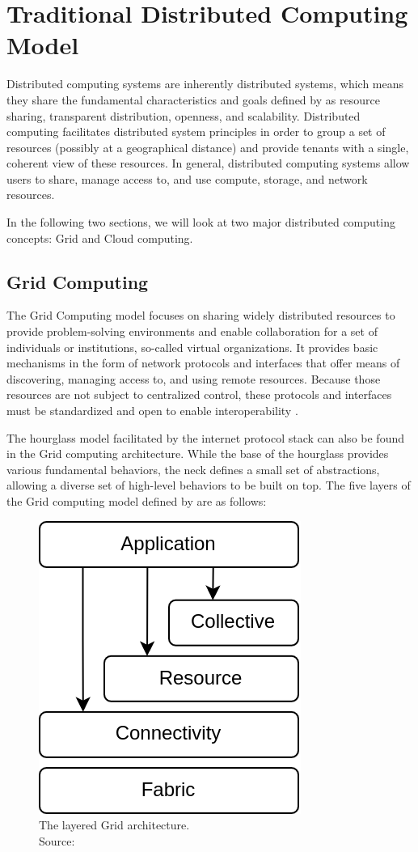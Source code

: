 \section{Traditional Distributed Computing Model}
\label{sec:traditional-distributed-computing}

Distributed computing systems are inherently distributed systems, which means
they share the fundamental characteristics and goals defined by
\citeauthor{tannenbaum2017} \cite{tannenbaum2017} as resource sharing,
transparent distribution, openness, and scalability. Distributed computing
facilitates distributed system principles in order to group a set of resources
(possibly at a geographical distance) and provide tenants with a single,
coherent view of these resources. In general, distributed computing systems
allow users to share, manage access to, and use compute, storage, and network
resources.

In the following two sections, we will look at two major distributed computing
concepts: Grid and Cloud computing.

\subsection{Grid Computing}

The Grid Computing model focuses on sharing widely distributed resources to
provide problem-solving environments and enable collaboration for a set of
individuals or institutions, so-called virtual organizations. It provides basic
mechanisms in the form of network protocols and interfaces that offer means of
discovering, managing access to, and using remote resources. Because those
resources are not subject to centralized control, these protocols and interfaces
must be standardized and open to enable interoperability \cite{foster2001grid}.

The hourglass model facilitated by the internet protocol stack can also be found
in the Grid computing architecture. While the base of the hourglass provides
various fundamental behaviors, the neck defines a small set of abstractions,
allowing a diverse set of high-level behaviors to be built on top. The five
layers of the Grid computing model defined by \citeauthor{foster2001grid}
\cite{foster2001grid} are as follows:

\begin{figure}[H]
  \centering
  \includegraphics[width=0.3\linewidth]{resources/grid-architecture.drawio.png}
  \caption[The layered Grid architecture.]{
    The layered Grid architecture.\\
    Source:  \cite{foster2001grid}
  }
  \label{fig:grid-architecture}
\end{figure}

